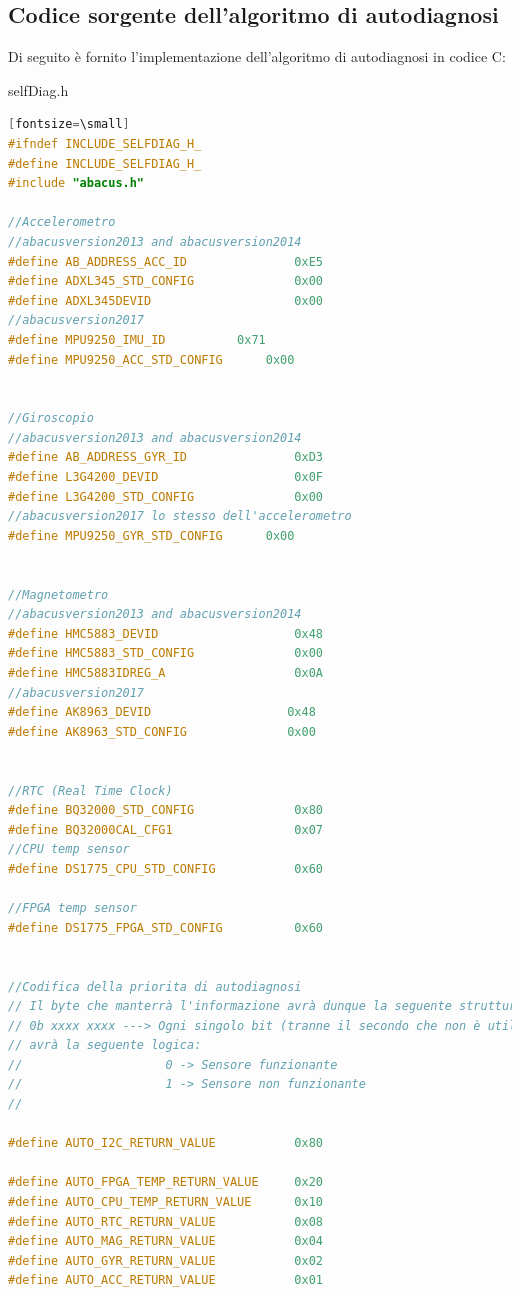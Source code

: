 \documentclass[LaM,binding=0.6cm]{../sapthesis}
\begin{document}
\clearpage
\subsection{Codice sorgente dell'algoritmo di autodiagnosi}
Di seguito è fornito l'implementazione dell'algoritmo di autodiagnosi in codice C:

selfDiag.h
\begin{lstlisting}[language=c][fontsize=\small]
#ifndef INCLUDE_SELFDIAG_H_
#define INCLUDE_SELFDIAG_H_
#include "abacus.h"

//Accelerometro
//abacusversion2013 and abacusversion2014
#define AB_ADDRESS_ACC_ID               0xE5
#define ADXL345_STD_CONFIG              0x00
#define ADXL345DEVID                    0x00
//abacusversion2017
#define MPU9250_IMU_ID			0x71
#define MPU9250_ACC_STD_CONFIG		0x00	


//Giroscopio
//abacusversion2013 and abacusversion2014
#define AB_ADDRESS_GYR_ID               0xD3
#define L3G4200_DEVID                   0x0F
#define L3G4200_STD_CONFIG              0x00
//abacusversion2017 lo stesso dell'accelerometro
#define MPU9250_GYR_STD_CONFIG		0x00


//Magnetometro
//abacusversion2013 and abacusversion2014
#define HMC5883_DEVID                   0x48   
#define HMC5883_STD_CONFIG              0x00
#define HMC5883IDREG_A                  0x0A
//abacusversion2017
#define AK8963_DEVID                   0x48
#define AK8963_STD_CONFIG              0x00


//RTC (Real Time Clock)
#define BQ32000_STD_CONFIG              0x80
#define BQ32000CAL_CFG1                 0x07
//CPU temp sensor
#define DS1775_CPU_STD_CONFIG           0x60

//FPGA temp sensor
#define DS1775_FPGA_STD_CONFIG          0x60


//Codifica della priorita di autodiagnosi
// Il byte che manterrà l'informazione avrà dunque la seguente struttura:
// 0b xxxx xxxx ---> Ogni singolo bit (tranne il secondo che non è utilizzato)
// avrà la seguente logica:
//                    0 -> Sensore funzionante
//                    1 -> Sensore non funzionante
//

#define AUTO_I2C_RETURN_VALUE           0x80

#define AUTO_FPGA_TEMP_RETURN_VALUE     0x20
#define AUTO_CPU_TEMP_RETURN_VALUE      0x10
#define AUTO_RTC_RETURN_VALUE           0x08
#define AUTO_MAG_RETURN_VALUE           0x04
#define AUTO_GYR_RETURN_VALUE           0x02
#define AUTO_ACC_RETURN_VALUE           0x01



\end{lstlisting}
\end{document}
